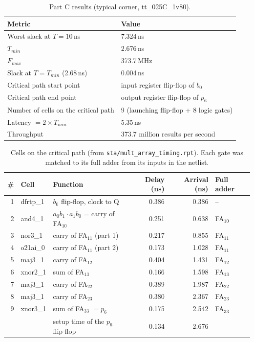 \documentclass[11pt,a4paper]{article}
\begin{document}
\begin{table}[H]
\centering
\begin{tabularx}{0.9\linewidth}{@{}lX@{}}
\toprule
Metric & Value \\
\midrule
Worst slack at $T = 10$\,ns & 7.324\,ns \\
$T_{min}$ & 2.676\,ns \\
$F_{max}$ & 373.7\,MHz \\
Slack at $T = T_{min}$ (2.68\,ns) & 0.004\,ns \\
Critical path start point & input register flip-flop of $b_0$ \\
Critical path end point & output register flip-flop of $p_6$ \\
Number of cells on the critical path & 9 (launching flip-flop + 8 logic gates) \\
Latency $= 2 \times T_{min}$ & 5.35\,ns \\
Throughput & 373.7 million results per second \\
\bottomrule
\end{tabularx}
\caption{Part C results (typical corner, tt\_025C\_1v80).}
\end{table}

\begin{table}[H]
\centering
\small
\begin{tabular}{@{}rllrrl@{}}
\toprule
\# & Cell & Function & Delay (ns) & Arrival (ns) & Full adder \\
\midrule
1 & dfrtp\_1 & $b_0$ flip-flop, clock to Q & 0.386 & 0.386 & -- \\
2 & and4\_1 & $a_0b_1 \cdot a_1b_0$ = carry of FA$_{10}$ & 0.251 & 0.638 & FA$_{10}$ \\
3 & nor3\_1 & carry of FA$_{11}$ (part 1) & 0.217 & 0.855 & FA$_{11}$ \\
4 & o21ai\_0 & carry of FA$_{11}$ (part 2) & 0.173 & 1.028 & FA$_{11}$ \\
5 & maj3\_1 & carry of FA$_{12}$ & 0.404 & 1.431 & FA$_{12}$ \\
6 & xnor2\_1 & sum of FA$_{13}$ & 0.166 & 1.598 & FA$_{13}$ \\
7 & maj3\_1 & carry of FA$_{22}$ & 0.389 & 1.987 & FA$_{22}$ \\
8 & maj3\_1 & carry of FA$_{23}$ & 0.380 & 2.367 & FA$_{23}$ \\
9 & xnor3\_1 & sum of FA$_{33}$ $= p_6$ & 0.175 & 2.542 & FA$_{33}$ \\
\midrule
 & & setup time of the $p_6$ flip-flop & 0.134 & 2.676 & \\
\bottomrule
\end{tabular}
\caption{Cells on the critical path (from \texttt{sta/mult\_array\_timing.rpt}). Each gate was
matched to its full adder from its inputs in the netlist.}
\end{table}
\end{document}
